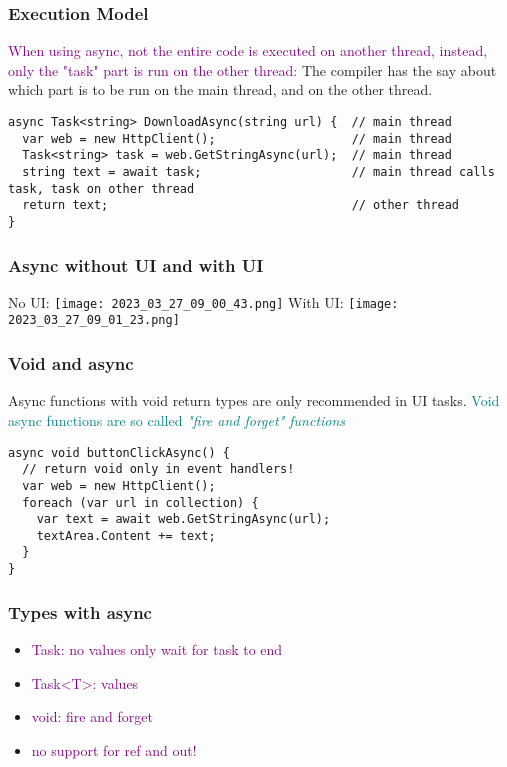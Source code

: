 \documentclass[main.tex,fontsize=8pt,paper=a4,paper=portrait,DIV=calc,]{scrartcl}
\begin{document}
\subsubsection{Execution Model}
\textcolor{purple}{When using async, not the entire code is executed on another thread, instead, only the "task" part is run on the other thread:}\newline
The compiler has the say about which part is to be run on the main thread, and on the other thread.
\begin{lstlisting}
async Task<string> DownloadAsync(string url) {  // main thread
  var web = new HttpClient();                   // main thread
  Task<string> task = web.GetStringAsync(url);  // main thread
  string text = await task;                     // main thread calls task, task on other thread
  return text;                                  // other thread
}
\end{lstlisting}

\subsubsection{Async without UI and with UI}
No UI:\newline
\texttt{[image: 2023\_03\_27\_09\_00\_43.png]}\newline
With UI:\newline
\texttt{[image: 2023\_03\_27\_09\_01\_23.png]}

\subsubsection{Void and async}
Async functions with void return types are only recommended in UI tasks.\newline
\textcolor{teal}{Void async functions are so called \emph{"fire and forget" functions}}
\begin{lstlisting}
async void buttonClickAsync() {
  // return void only in event handlers!
  var web = new HttpClient();
  foreach (var url in collection) {
    var text = await web.GetStringAsync(url);
    textArea.Content += text;
  }
}
\end{lstlisting}

\subsubsection{Types with async}
\begin{itemize}
\item \textcolor{purple}{Task: no values only wait for task to end}
\item \textcolor{purple}{Task<T>: values}
\item \textcolor{purple}{void: fire and forget}
\item \textcolor{purple}{no support for ref and out!}
\end{itemize} 
\end{document}
